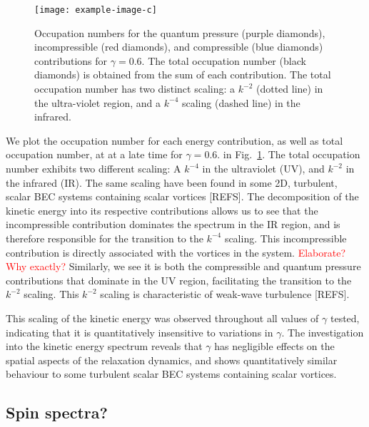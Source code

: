 \begin{figure}
    \centering
    \texttt{[image: example-image-c]}
    \caption{Occupation numbers for the quantum pressure (purple diamonds),
    incompressible (red diamonds), and compressible (blue diamonds)
    contributions for $\gamma=0.6$.
    The total occupation number (black diamonds) is obtained from the
    sum of each contribution.
    The total occupation number has two distinct scaling: a $k^{-2}$ 
    (dotted line) in the ultra-violet region, and a $k^{-4}$ scaling
    (dashed line) in the infrared.}
    \label{fig:kinetic-energy-spectra}
\end{figure}
We plot the occupation number for each energy contribution, as well as total
occupation number, at at a late time for $\gamma=0.6.$ in
Fig.~\ref{fig:kinetic-energy-spectra}.
The total occupation number exhibits two different scaling: A $k^{-4}$ in the
ultraviolet (UV), and $k^{-2}$ in the infrared (IR). 
The same scaling have been found in some 2D, turbulent, scalar BEC systems
containing scalar vortices [REFS].
The decomposition of the kinetic energy into its respective contributions
allows us to see that the incompressible contribution dominates the spectrum
in the IR region, and is therefore responsible for the transition to the
$k^{-4}$ scaling.
This incompressible contribution is directly associated with the vortices in
the system. \textcolor{red}{Elaborate? Why exactly?}
Similarly, we see it is both the compressible and quantum pressure contributions
that dominate in the UV region, facilitating the transition to the $k^{-2}$
scaling.
This $k^{-2}$ scaling is characteristic of weak-wave turbulence [REFS].

This scaling of the kinetic energy was observed throughout all values of
$\gamma$ tested, indicating that it is quantitatively insensitive to variations
in $\gamma$.
The investigation into the kinetic energy spectrum reveals that $\gamma$ has
negligible effects on the spatial aspects of the relaxation dynamics, and shows
quantitatively similar behaviour to some turbulent scalar BEC systems
containing scalar vortices.

\subsection{Spin spectra?}

